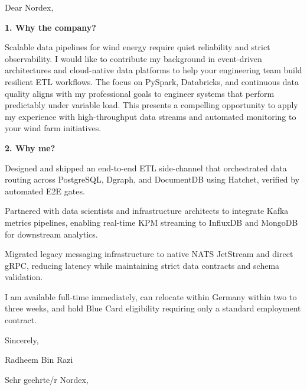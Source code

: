 \documentclass[11pt,a4paper]{coverletter}
\begin{document}

\opening{Dear Nordex,}

\vspace{8pt}\noindent\textbf{1. Why the company?}\par\vspace{3pt}

Scalable data pipelines for wind energy require quiet reliability and strict observability. I would like to contribute my background in event-driven architectures and cloud-native data platforms to help your engineering team build resilient ETL workflows. The focus on PySpark, Databricks, and continuous data quality aligns with my professional goals to engineer systems that perform predictably under variable load. This presents a compelling opportunity to apply my experience with high-throughput data streams and automated monitoring to your wind farm initiatives.

\vspace{8pt}\noindent\textbf{2. Why me?}\par\vspace{3pt}

\bullets

  \item Designed and shipped an end-to-end ETL side-channel that orchestrated data routing across PostgreSQL, Dgraph, and DocumentDB using Hatchet, verified by automated E2E gates.

  \item Partnered with data scientists and infrastructure architects to integrate Kafka metrics pipelines, enabling real-time KPM streaming to InfluxDB and MongoDB for downstream analytics.

  \item Migrated legacy messaging infrastructure to native NATS JetStream and direct gRPC, reducing latency while maintaining strict data contracts and schema validation.

\bulletsend

I am available full-time immediately, can relocate within Germany within two to three weeks, and hold Blue Card eligibility requiring only a standard employment contract.

\closing{Sincerely,}{Radheem Bin Razi}

\clearpage
{}


\opening{Sehr geehrte/r Nordex,}
\end{document}
